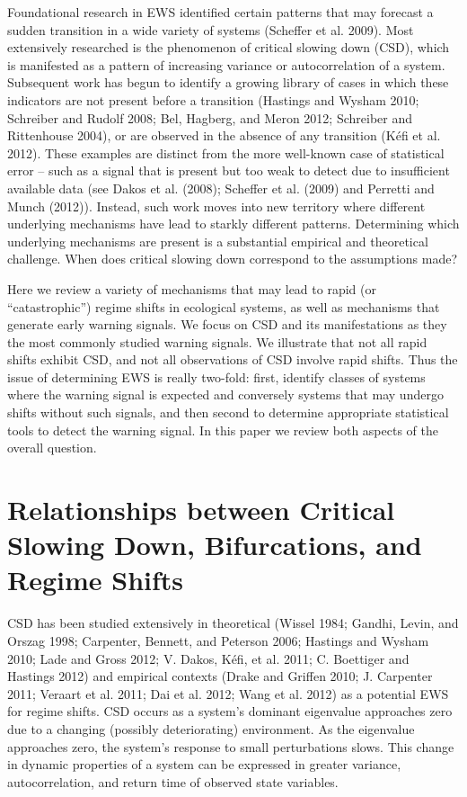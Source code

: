 \documentclass[author-year, review]{elsarticle} %
\begin{document}
Foundational research in EWS identified certain patterns that may
forecast a sudden transition in a wide variety of systems (Scheffer et
al. 2009). Most extensively researched is the phenomenon of critical
slowing down (CSD), which is manifested as a pattern of increasing
variance or autocorrelation of a system. Subsequent work has begun to
identify a growing library of cases in which these indicators are not
present before a transition (Hastings and Wysham 2010; Schreiber and
Rudolf 2008; Bel, Hagberg, and Meron 2012; Schreiber and Rittenhouse
2004), or are observed in the absence of any transition (Kéfi et al.
2012). These examples are distinct from the more well-known case of
statistical error -- such as a signal that is present but too weak to
detect due to insufficient available data (see Dakos et al. (2008);
Scheffer et al. (2009) and Perretti and Munch (2012)). Instead, such
work moves into new territory where different underlying mechanisms have
lead to starkly different patterns. Determining which underlying
mechanisms are present is a substantial empirical and theoretical
challenge. When does critical slowing down correspond to the assumptions
made?

Here we review a variety of mechanisms that may lead to rapid (or
``catastrophic'') regime shifts in ecological systems, as well as
mechanisms that generate early warning signals. We focus on CSD and its
manifestations as they the most commonly studied warning signals. We
illustrate that not all rapid shifts exhibit CSD, and not all
observations of CSD involve rapid shifts. Thus the issue of determining
EWS is really two-fold: first, identify classes of systems where the
warning signal is expected and conversely systems that may undergo
shifts without such signals, and then second to determine appropriate
statistical tools to detect the warning signal. In this paper we review
both aspects of the overall question.

\section{Relationships between Critical Slowing Down, Bifurcations, and
Regime Shifts}

CSD has been studied extensively in theoretical (Wissel 1984; Gandhi,
Levin, and Orszag 1998; Carpenter, Bennett, and Peterson 2006; Hastings
and Wysham 2010; Lade and Gross 2012; V. Dakos, Kéfi, et al. 2011; C.
Boettiger and Hastings 2012) and empirical contexts (Drake and Griffen
2010; J. Carpenter 2011; Veraart et al. 2011; Dai et al. 2012; Wang et
al. 2012) as a potential EWS for regime shifts. CSD occurs as a system's
dominant eigenvalue approaches zero due to a changing (possibly
deteriorating) environment. As the eigenvalue approaches zero, the
system's response to small perturbations slows. This change in dynamic
properties of a system can be expressed in greater variance,
autocorrelation, and return time of observed state variables.
\end{document}
